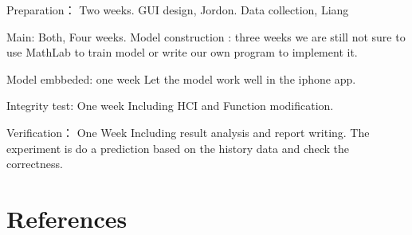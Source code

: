 \documentclass[12pt]{article}
\begin{document}
Preparation： Two weeks.
    GUI design, Jordon. 
    Data collection, Liang

Main: Both, Four weeks.
    Model construction : three weeks  
    we are still not sure to use MathLab to train model or write our
    own program to implement it.

    Model embbeded: one week
    Let the model work well in the iphone app.

Integrity test: One week
    Including HCI and Function modification. 

Verification： One Week
    Including result analysis and report writing. The experiment is do
    a prediction based on the history data and check the correctness.


\section{References}

\end{document}
